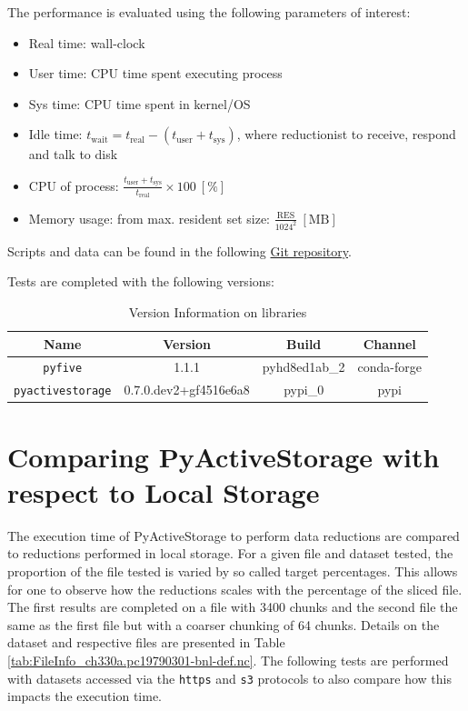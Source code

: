 \documentclass{article}
\begin{document}
\noindent The performance is evaluated using the following parameters of interest:

\begin{itemize}
    \item Real time: wall-clock
    \item User time: CPU time spent executing process
    \item Sys time: CPU time spent in kernel/OS
    \item Idle time: $t_\text{wait} = t_\text{real} - (t_\text{user} + t_\text{sys})$, where reductionist to receive, respond and talk to disk  
    \item CPU of process: $\frac{t_\text{user}+ t_\text{sys}}{t_\text{real}} \times 100~[\%]$
    \item Memory usage: from max. resident set size: $\frac{\text{RES}}{1024^2}~[\text{MB}]$
\end{itemize}

Scripts and data can be found in the following \href{https://github.com/valeriupredoi/testing_PyActiveStorage/tree/main/tests_Varsiha}{Git repository}.

Tests are completed with the following versions:
\begin{table}[h!] 
    \centering 
    \renewcommand{\arraystretch}{1.1}
    \begin{tabular}{cccc}  \hline
        Name            &   Version                 & Build           & Channel \\ \hline
        \texttt{pyfive}          &     1.1.1                 &   pyhd8ed1ab\_2  &   conda-forge \\
        \texttt{pyactivestorage} &     0.7.0.dev2+gf4516e6a8 &   pypi\_0        &   pypi \\ \hline
    \end{tabular} 
    \caption{Version Information on libraries} 
    \label{tab:LibraryVersionInfo} 
\end{table}

\newpage

\section{Comparing PyActiveStorage with respect to Local Storage}

The execution time of PyActiveStorage to perform data reductions are compared to reductions performed in local storage. For a given file and dataset tested, the proportion of the file tested is varied by so called target percentages. This allows for one to observe how the reductions scales with the percentage of the sliced file. The first results are completed on a file with 3400 chunks and the second file the same as the first file but with a coarser chunking of 64 chunks. Details on the dataset and respective files are presented in  Table \ref{tab:FileInfo_ch330a.pc19790301-bnl-def.nc}. The following tests are performed with datasets accessed via the \texttt{https} and \texttt{s3} protocols to also compare how this impacts the execution time. 
\end{document}
